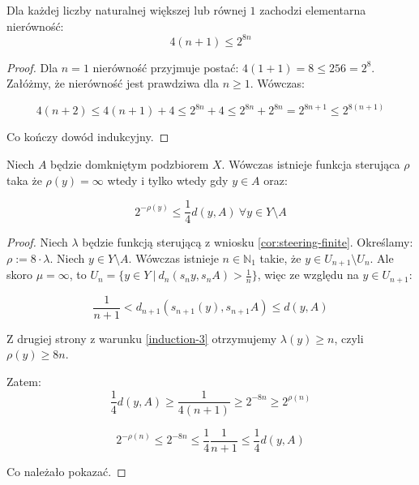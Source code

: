 \begin{lem}
  Dla każdej liczby naturalnej większej lub równej $1$ zachodzi elementarna nierówność:
  \[4(n+1) \leq 2^{8n}\]
  
  \begin{proof}
    Dla $n = 1$ nierówność przyjmuje postać: $4(1+1) = 8 \leq 256 = 2^8$.
    Załóżmy, że nierówność jest prawdziwa dla $n \geq 1$. Wówczas:
    
    \[4(n+2) \leq 4(n+1) + 4 \leq 2^{8n} + 4 \leq 2^{8n} + 2^{8n} = 2^{8n + 1} \leq 2^{8(n+1)}\]
    
    Co kończy dowód indukcyjny.
  \end{proof}
\end{lem}

\begin{cor} \label{cor:steering-dist}
  Niech $A$ będzie domkniętym podzbiorem $X$. Wówczas istnieje funkcja sterująca $\rho$ taka że $\rho(y) = \infty$ wtedy i tylko wtedy gdy $y \in A$ oraz:
  
  \[2^{-\rho(y)} \leq \frac{1}{4}d(y,A)\ \forall y \in Y \setminus A\]
  
  \begin{proof}
    Niech $\lambda$ będzie funkcją sterującą z wniosku \eqref{cor:steering-finite}. Określamy: $\rho := 8 \cdot \lambda$.
    Niech $y \in Y \setminus A$. Wówczas istnieje $n \in \mathbb{N}_1$ takie, że $y \in U_{n+1} \setminus U_n$. Ale skoro $\mu = \infty$, to $U_n = \{y \in Y\ |\ d_n(s_n y, s_n A) > \frac{1}{n}\}$, więc ze względu na $y \in U_{n+1}$:
    
    \[\frac{1}{n+1} < d_{n+1}(s_{n+1}(y), s_{n+1} A)  \leq d(y, A)\]
    
    Z drugiej strony z warunku \eqref{induction-3} otrzymujemy $\lambda(y) \geq n$, czyli $\rho(y) \geq 8n$.
    
    Zatem:
    \[\frac{1}{4}d(y,A) \geq \frac{1}{4(n+1)} \geq 2^{-8n} \geq 2^{\rho(n)}\]
    
    \[2^{-\rho(n)} \leq 2^{-8n} \leq \frac{1}{4}\frac{1}{n+1} \leq \frac{1}{4}d(y,A)\]
    
    Co należało pokazać.
  \end{proof}
\end{cor}


